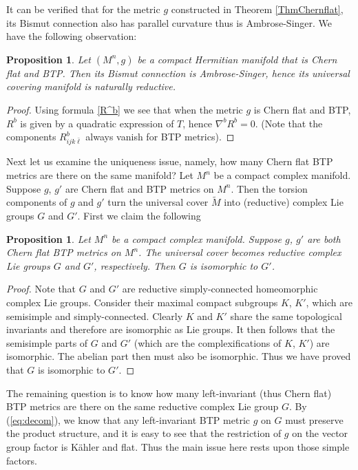 \documentclass{amsart}
\numberwithin{equation}{section}
\newtheorem{proposition}[theorem]{Proposition}
\theoremstyle{definition}
\renewcommand{\1}{\mathds{1}}
\renewcommand{\>}{\rightarrow}
\begin{document}
It can be verified that for the metric $g$ constructed in Theorem \ref{ThmChernflat}, its Bismut connection also has parallel curvature thus is Ambrose-Singer. We have the following observation:

\begin{proposition}\label{ChernflatBAS}
Let $(M^n,g)$ be a compact Hermitian manifold that is Chern flat and {\rm BTP}. Then its Bismut connection is Ambrose-Singer, hence its universal covering manifold is naturally reductive.
\end{proposition}

\begin{proof} Using formula \eqref{R^b}  we see that when the metric $g$ is Chern flat and {\rm BTP}, $R^b$ is given by a quadratic expression of $T$, hence $\nabla^bR^b=0$. (Note that the components $R^b_{ijk\bar{\ell}}$ always vanish for {\rm  BTP} metrics).
\end{proof}


Next let us examine the uniqueness issue, namely, how many Chern flat {\rm BTP} metrics are there on the same manifold?
Let $M^n$ be a compact complex manifold. Suppose $g$, $g'$ are Chern flat and {\rm BTP} metrics on $M^n$. Then the torsion components of $g$ and $g'$ turn the universal cover $\widetilde{M}$ into (reductive) complex Lie groups $G$ and $G'$. First we claim the following

\begin{proposition}
Let $M^n$ be a compact complex manifold. Suppose $g$, $g'$ are both Chern flat {\rm BTP} metrics on $M^n$. The universal cover becomes reductive complex Lie groups $G$ and $G'$, respectively. Then $G$ is isomorphic to $G'$.
\end{proposition}

\begin{proof}
Note that $G$ and $G'$  are reductive simply-connected homeomorphic complex Lie groups. Consider their maximal compact subgroups $K$, $K'$, which are semisimple and simply-connected. Clearly $K$ and $K'$ share the same topological invariants and therefore are isomorphic as Lie groups. It then follows that the semisimple parts of $G$  and $G'$ (which are the complexifications of $K$, $K'$) are isomorphic. The abelian part then must also be isomorphic. Thus we have proved that $G$ is isomorphic to $G'$.
\end{proof}

The remaining question is to know how many left-invariant (thus Chern flat) {\rm BTP} metrics are there on the same reductive complex Lie group $G$. By (\ref{eq:decom}), we know that any left-invariant {\rm BTP} metric $g$ on $G$ must preserve the product structure, and it is easy to see that the restriction of $g$ on the vector group factor is K\"ahler and flat. Thus the main issue here rests upon those simple factors.
\end{document}
